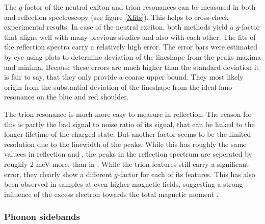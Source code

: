 The $g$-factor of the neutral exiton and trion resonances can be measured in both \pl and reflection spectroscopy (see figure \ref{Xfits}). This helps to cross-check experimental results. In case of the neutral exciton, both methods yield a $g$-factor that aligns well with many previous studies \cite{plechinger_excitonic_2016, stier_exciton_2016, srivastava_valley_2015, mitioglu_magnetoexcitons_2016}and also with each other. The fits of the reflection spectra carry a relatively high error. The error bars were estimated by eye using plots to determine deviation of the lineshape from the peaks maxima and minima. Because these errors are much higher than the standard deviation it is fair to say, that they only provide a coarse upper bound. They most likely origin from the substantial deviation of the lineshape from the ideal fano-resonance on the blue and red shoulder.

The trion resonance is much more easy to measure in reflection. The reason for this is partly the bad signal to noise ratio of its \pl signal, that can be linked to the longer lifetime of the charged state\cite{hao_trion_2017}. But another factor seems to be the limited resolution due to the linewidth of the peaks. While this has roughly the same valuees in reflection and \pl, the peaks in the reflection spectrum are seperated by roughly 2 meV more, than in \pl. While the trion features still carry a significant error, they clearly show a different $g$-factor for each of its features. This has also been observed in \ws samples at even higher magnetic fields, suggesting a strong influence of the excess electron towards the total magnetic moment \cite{plechinger_excitonic_2016}.

\subsubsection{Phonon sidebands}

